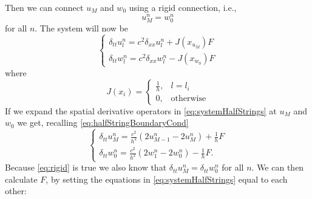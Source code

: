 \documentclass[dvipsnames]{article}
\begin{document}
\noindent Then we can connect $u_M$ and $w_0$ using a rigid connection, i.e.,
\begin{equation}\label{eq:rigid}
    u_M^n = w_0^n
\end{equation}
for all $n$. The system will now be
\begin{equation}
    \begin{cases}\label{eq:systemHalfStrings}
        \delta_{tt}u_l^n = c^2\delta_{xx}u_l^n + J(x_{u_M})F\\
        \delta_{tt}w_l^n = c^2\delta_{xx}w_l^n - J(x_{w_0})F
    \end{cases}
\end{equation}
where
\begin{equation}
    J(x_i) =
    \begin{cases}
        \frac{1}{h}, & l = l_i\\
        0,& \text{otherwise}
    \end{cases}
\end{equation}
If we expand the spatial derivative operators in \eqref{eq:systemHalfStrings} at $u_M$ and $w_0$ we get, recalling \eqref{eq:halfStringBoundaryCond}
\begin{equation}\label{eq:expandedSystem}
    \begin{cases}
        \delta_{tt}u_M^n = \frac{c^2}{h^2}(2u_{M-1}^n-2u_M^n) + \frac{1}{h}F\\
        \delta_{tt}w_0^n = \frac{c^2}{h^2}(2w_1^n-2w_0^n) - \frac{1}{h}F.
    \end{cases}
\end{equation}
Because \eqref{eq:rigid} is true we also know that $\delta_{tt}u_M^n = \delta_{tt}w_0^n$ for all $n$. We can then calculate $F$, by setting the equations in \eqref{eq:systemHalfStrings} equal to each other:

\end{document}
